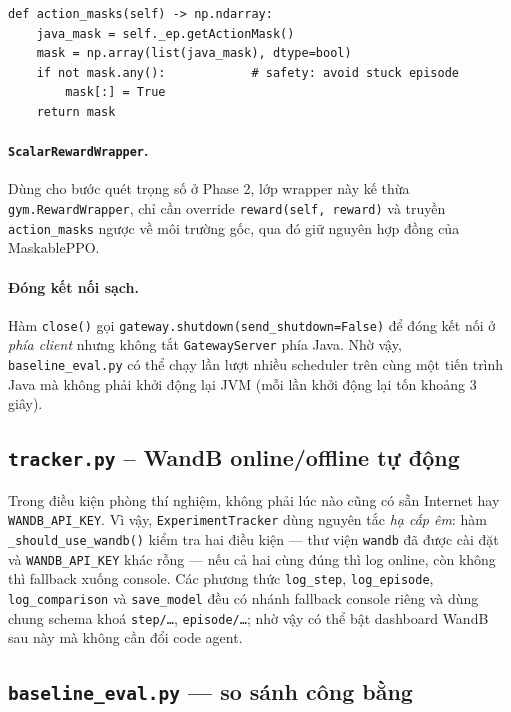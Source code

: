 \begin{lstlisting}[style=pythonstyle, caption={\texttt{action\_masks()}
-- fail-open để không khoá episode.}, label={lst:action-masks}]
def action_masks(self) -> np.ndarray:
    java_mask = self._ep.getActionMask()
    mask = np.array(list(java_mask), dtype=bool)
    if not mask.any():            # safety: avoid stuck episode
        mask[:] = True
    return mask
\end{lstlisting}

\paragraph{\texttt{ScalarRewardWrapper}.} Dùng cho bước quét trọng số
ở Phase 2, lớp wrapper này kế thừa \texttt{gym.RewardWrapper}, chỉ
cần override \texttt{reward(self, reward)} và truyền
\texttt{action\_masks} ngược về môi trường gốc, qua đó giữ nguyên
hợp đồng của MaskablePPO.

\paragraph{Đóng kết nối sạch.} Hàm \texttt{close()} gọi
\texttt{gateway.shutdown(send\_shutdown=False)} để đóng kết nối ở
\emph{phía client} nhưng không tắt \texttt{GatewayServer} phía Java.
Nhờ vậy, \texttt{baseline\_eval.py} có thể chạy lần lượt nhiều
scheduler trên cùng một tiến trình Java mà không phải khởi động lại
JVM (mỗi lần khởi động lại tốn khoảng $3$\,giây).

\subsection{\texttt{tracker.py} -- WandB online/offline tự động}
\label{ssec:impl-tracker}

Trong điều kiện phòng thí nghiệm, không phải lúc nào cũng có sẵn
Internet hay \texttt{WANDB\_API\_KEY}. Vì vậy,
\texttt{ExperimentTracker} dùng nguyên tắc \emph{hạ cấp êm}: hàm
\texttt{\_should\_use\_wandb()} kiểm tra hai điều kiện --- thư viện
\texttt{wandb} đã được cài đặt và \texttt{WANDB\_API\_KEY} khác rỗng
--- nếu cả hai cùng đúng thì log online, còn không thì fallback
xuống console. Các phương thức \texttt{log\_step},
\texttt{log\_episode}, \texttt{log\_comparison} và
\texttt{save\_model} đều có nhánh fallback console riêng và dùng
chung schema khoá \texttt{step/\dots}, \texttt{episode/\dots}; nhờ
vậy có thể bật dashboard WandB sau này mà không cần đổi code agent.

\subsection{\texttt{baseline\_eval.py} --- so sánh công bằng}
\label{ssec:impl-baseline-eval}

